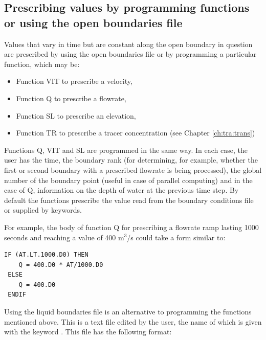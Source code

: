 \subsection{ Prescribing values by programming functions or using the open boundaries file}
\label{subs:val:funct:bf}
 Values that vary in time but are constant along the open boundary in question are prescribed by using the open boundaries file or by programming a particular function, which may be:

\begin{itemize}
\item  Function VIT to prescribe a velocity,

\item  Function  Q to prescribe a flowrate,

\item  Function  SL to prescribe an elevation,

\item  Function TR to prescribe a tracer concentration (see Chapter \ref{ch:tra:trans})
\end{itemize}

 Functions Q, VIT and SL are programmed in the same way. In each case, the user has the time, the boundary rank (for determining, for example, whether the first or second boundary with a prescribed flowrate is being processed), the global number of the boundary point (useful in case of parallel computing) and in the case of Q, information on the depth of water at the previous time step. By default the functions prescribe the value read from the boundary conditions file or supplied by keywords.

 For example, the body of function Q for prescribing a flowrate ramp lasting 1000 seconds and reaching a value of 400 m${}^{3}$/s could take a form similar to:
\begin{lstlisting}[language=TelFortran]
 IF (AT.LT.1000.D0) THEN
    Q = 400.D0 * AT/1000.D0
 ELSE
    Q = 400.D0
 ENDIF
\end{lstlisting}
 Using the liquid boundaries file is an alternative to programming the functions mentioned above. This is a text file edited by the user, the name of which is given with the keyword . This file has the following format:

